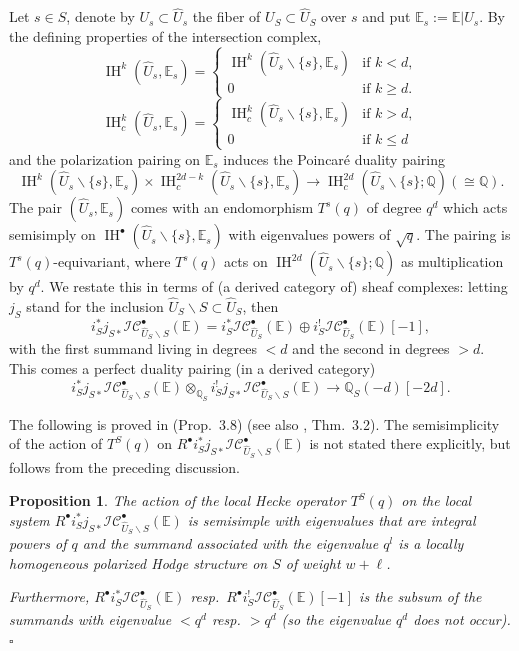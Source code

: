 \documentclass[12pt,letterpaper]{amsart}
\numberwithin{equation}{section}
\def\EE{{\mathbb E}}
\def\QQ{{\mathbb Q}}
\def\ssm{\smallsetminus}
\def\Iscr{{\mathscr I}}
\def\Cscr{{\mathscr C}}
\def\pt{{\scriptscriptstyle\bullet}}
\newcommand\IH{\operatorname{IH}}
\newtheorem{proposition}[theorem]{Proposition}
\theoremstyle{remark}
\begin{document}
Let $s\in S$, denote by $U_s\subset \hat U_s$  the fiber of  $U_S\subset \hat U_S$ over $s$ and put $\EE_s:=\EE|U_s$. By the  defining properties of the intersection complex,
\[
\IH^k(\hat U_s, \EE_s )=
\begin{cases}
\IH^k(\hat U_s\ssm \{s\}, \EE_s)&\text{if $k<d$},\\
0 & \text{if $k\ge d$.}
\end{cases}
\]
\[
\IH_c^k(\hat U_s, \EE_s)=
\begin{cases}
\IH_c^{k}(\hat U_s\ssm \{s\}, \EE_s)&\text{if $k>d$},\\
0 & \text{if $k\le d$}
\end{cases}
\]
and the  polarization pairing  on $\EE_s$ induces the Poincar\'e duality pairing
\[
\IH^k(\hat U_s\ssm\{s\}, \EE_s)\times \IH_c^{2d-k}(\hat U_s\ssm \{s\}, \EE_s)\to \IH_c^{2d}(\hat U_s\ssm \{s\}; \QQ) (\cong \QQ).
\] 
The pair $(\hat U_s, \EE_s)$ comes with an endomorphism $T^s(q)$ of degree $q^d$ which acts semisimply on $\IH^\pt(\hat U_s\ssm\{s\},\EE_s)$ with eigenvalues powers of  $\sqrt{q}$.  The pairing  is $T^s(q)$-equivariant, where $T^s(q)$  acts on $\IH^{2d}(\hat U_s\ssm \{s\}; \QQ)$  as multiplication by $q^d$. 
We  restate this  in  terms of (a derived category of) sheaf complexes: letting $j_S$ stand for the inclusion $\hat U_S\ssm S\subset \hat U_S$, then
\begin{equation}\label{eqn:dec}
i_S^*j_{S*}\Iscr\Cscr_{\hat U_S\ssm S}^\pt(\EE)= i_S^*\Iscr\Cscr_{\hat U_S}^\pt(\EE)\oplus  i_S^!\Iscr\Cscr_{\hat U_S}^\pt(\EE)[-1],
\end{equation}
with the first summand living in degrees $<d$ and the second in degrees $>d$. This comes a perfect duality pairing (in a derived category)
\[
i_S^*j_{S*}\Iscr\Cscr_{\hat U_S\ssm S}^\pt(\EE)\otimes_{\QQ_S}  i_S^!j_{S*}\Iscr\Cscr_{\hat U_S\ssm S}^\pt(\EE)\to \QQ_S(-d)[-2d].
\]

The following is proved in \cite{looij:l2} (Prop.\  3.8) (see also \cite{lr}, Thm.\  3.2). The semisimplicity of the  action of  $T^S(q)$ on $R^\pt i_S^*j_{S*}\Iscr\Cscr_{\hat U_S\ssm S}^\pt(\EE)$  is not stated there explicitly, but follows from the preceding discussion.


\begin{proposition}\label{prop:Phi_IC}
The action of the local Hecke operator $T^S(q)$  on  the local system $R^\pt i_S^*j_{S*}\Iscr\Cscr_{\hat U_S\ssm S}^\pt(\EE)$ is semisimple  with eigenvalues that are integral powers of $q$ and the summand associated with the eigenvalue $q^l$  is a locally homogeneous polarized Hodge structure on $S$ of weight $w+\ell$. 

Furthermore,  $R^\pt i^*_S\Iscr\Cscr^\pt_{\hat U_S}(\EE)$ resp.\ 
$R^\pt i_S^!\Iscr\Cscr_{\hat U_S}^\pt(\EE)[-1]$ is  the subsum of the summands with eigenvalue  $<q^d$ resp. $>q^d$
(so the  eigenvalue $q^d$ does not occur).
\hfill $\square$
\end{proposition}
\end{document}
